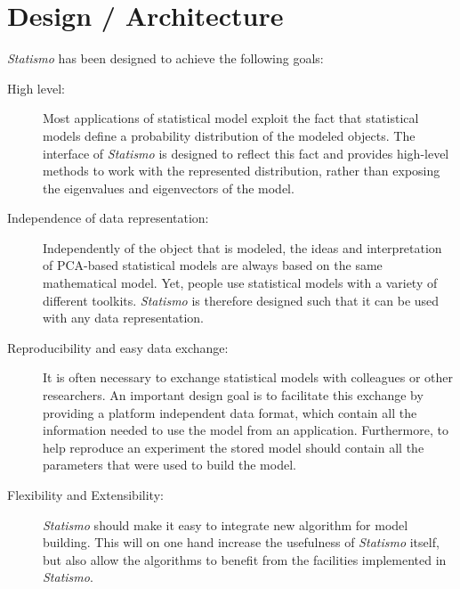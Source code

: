 \documentclass{InsightArticle}
\newcommand{\Statismo}{\emph{Statismo}\xspace}
\begin{document}
\section{Design / Architecture}
\Statismo has been designed to achieve the following goals:
\begin{description}
\item[High level:] Most applications of statistical model exploit the
  fact that statistical models define a probability distribution of
  the modeled objects. The interface of \Statismo is designed to reflect this fact and provides
  high-level methods to work with the represented distribution, rather than 
  exposing the eigenvalues and eigenvectors of the model. 
\item[Independence of data representation:] Independently of the
  object that is modeled, the ideas and interpretation of PCA-based
  statistical models are always based on the same mathematical model.
  Yet, people use statistical models with a variety of different
  toolkits. \Statismo is therefore designed such that it can be used with 
  any data representation. 
\item[Reproducibility and easy data exchange:] 
  It is often necessary to exchange statistical models with colleagues or other researchers. 
  An important design goal is to facilitate this exchange by providing a platform independent data format, 
  which contain all the information needed to use the model from an application. 
  Furthermore, to help reproduce an experiment the stored model should contain all the parameters
  that were used to build the model. 
\item[Flexibility and Extensibility:] 
  \Statismo should make it easy to integrate new algorithm for model building. 
  This will on one hand increase the usefulness of \Statismo itself, but also 
  allow the algorithms to benefit from the facilities implemented in \Statismo. 
\end{description}
\end{document}
